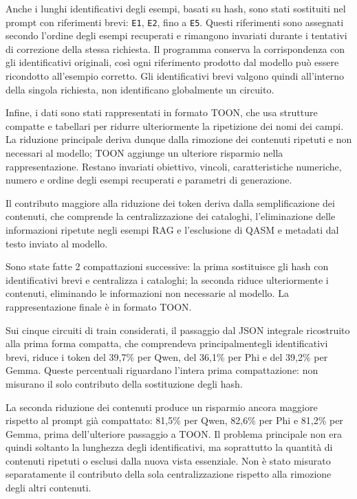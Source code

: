 Anche i lunghi identificativi degli esempi, basati su hash,
sono stati sostituiti nel prompt con riferimenti brevi:
\texttt{E1}, \texttt{E2}, fino a \texttt{E5}.
Questi riferimenti sono assegnati secondo l'ordine degli esempi
recuperati e rimangono invariati durante i tentativi di correzione
della stessa richiesta. Il programma conserva la corrispondenza
con gli identificativi originali, così ogni riferimento prodotto
dal modello può essere ricondotto all'esempio corretto.
Gli identificativi brevi valgono quindi all'interno della singola
richiesta, non identificano globalmente un circuito.

Infine, i dati sono stati rappresentati in formato TOON, che usa
strutture compatte e tabellari per ridurre ulteriormente la ripetizione
dei nomi dei campi. La riduzione principale deriva dunque dalla
rimozione dei contenuti ripetuti e non necessari al modello;
TOON aggiunge un ulteriore risparmio nella rappresentazione.
Restano invariati obiettivo, vincoli, caratteristiche numeriche,
numero e ordine degli esempi recuperati e parametri di generazione.

Il contributo maggiore alla riduzione dei token deriva dalla
semplificazione dei contenuti, che comprende la centralizzazione
dei cataloghi, l'eliminazione delle informazioni ripetute negli
esempi RAG e l'esclusione di QASM e metadati dal testo inviato
al modello.

Sono state fatte 2 compattazioni successive: la prima sostituisce gli hash con identificativi brevi e centralizza i cataloghi; la seconda riduce ulteriormente i contenuti, eliminando le informazioni non necessarie al modello. 
La rappresentazione finale è in formato TOON.

Sui cinque circuiti di train considerati, il passaggio dal JSON
integrale ricostruito alla prima forma compatta,
che comprendeva principalmentegli identificativi brevi, riduce i token
del 39,7\% per Qwen, del 36,1\% per Phi e del 39,2\% per Gemma.
Queste percentuali riguardano l'intera prima compattazione:
non misurano il solo contributo della sostituzione degli hash.

La seconda riduzione dei contenuti produce un risparmio
ancora maggiore rispetto al prompt già compattato:
81,5\% per Qwen, 82,6\% per Phi e 81,2\% per Gemma,
prima dell'ulteriore passaggio a TOON.
Il problema principale non era quindi soltanto la lunghezza
degli identificativi, ma soprattutto la quantità di contenuti
ripetuti o esclusi dalla nuova vista essenziale.
Non è stato misurato separatamente il contributo della sola
centralizzazione rispetto alla rimozione degli altri contenuti.

